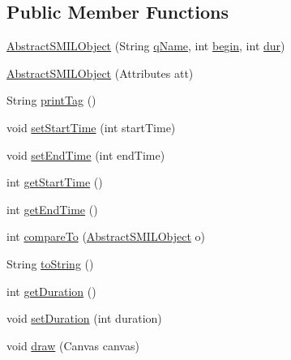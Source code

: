 \subsection*{Public Member Functions}
\begin{DoxyCompactItemize}
\item 
\hyperlink{classcsc440_1_1nuf_1_1components_1_1_abstract_s_m_i_l_object_a7d4ffbcec68b7a75bfb1a69b9ead2734}{Abstract\-S\-M\-I\-L\-Object} (String \hyperlink{classcsc440_1_1nuf_1_1components_1_1_abstract_s_m_i_l_object_a6f53b3bd6f031aea98d92c84ddd8c8db}{q\-Name}, int \hyperlink{classcsc440_1_1nuf_1_1components_1_1_abstract_s_m_i_l_object_a3279cee1dba4afdcc793a276d05bb7a1}{begin}, int \hyperlink{classcsc440_1_1nuf_1_1components_1_1_abstract_s_m_i_l_object_a8e4a82668aeae5fb178466d5579cd1e9}{dur})
\item 
\hyperlink{classcsc440_1_1nuf_1_1components_1_1_abstract_s_m_i_l_object_a30ec13c486b3b2ddd7c1911d69ebd8d3}{Abstract\-S\-M\-I\-L\-Object} (Attributes att)
\item 
String \hyperlink{classcsc440_1_1nuf_1_1components_1_1_abstract_s_m_i_l_object_a6b7e0dec2a36758ce801132d7c040974}{print\-Tag} ()
\item 
void \hyperlink{classcsc440_1_1nuf_1_1components_1_1_abstract_s_m_i_l_object_a63fa1f8e7b3d8e110fba9b9914137350}{set\-Start\-Time} (int start\-Time)
\item 
void \hyperlink{classcsc440_1_1nuf_1_1components_1_1_abstract_s_m_i_l_object_a3b153d8b1c68f8278a9565cc254e1a9e}{set\-End\-Time} (int end\-Time)
\item 
int \hyperlink{classcsc440_1_1nuf_1_1components_1_1_abstract_s_m_i_l_object_a243ba9744414f121ea34960bc4a15c26}{get\-Start\-Time} ()
\item 
int \hyperlink{classcsc440_1_1nuf_1_1components_1_1_abstract_s_m_i_l_object_acb56c0543fc58acf2929479598647bcb}{get\-End\-Time} ()
\item 
int \hyperlink{classcsc440_1_1nuf_1_1components_1_1_abstract_s_m_i_l_object_a85eb33753bf3769bc240cee7b632e8fd}{compare\-To} (\hyperlink{classcsc440_1_1nuf_1_1components_1_1_abstract_s_m_i_l_object}{Abstract\-S\-M\-I\-L\-Object} o)
\item 
String \hyperlink{classcsc440_1_1nuf_1_1components_1_1_abstract_s_m_i_l_object_ae615c694ad1f4377089ef15e41c77006}{to\-String} ()
\item 
int \hyperlink{classcsc440_1_1nuf_1_1components_1_1_abstract_s_m_i_l_object_abd5dd2e6eef92f800197b160936d9f35}{get\-Duration} ()
\item 
void \hyperlink{classcsc440_1_1nuf_1_1components_1_1_abstract_s_m_i_l_object_ab56e7a3d66c7dba0e005482e200792a2}{set\-Duration} (int duration)
\item 
void \hyperlink{classcsc440_1_1nuf_1_1components_1_1_abstract_s_m_i_l_object_a3bacb759032970e83ba2ffc4ed5179b9}{draw} (Canvas canvas)
\end{DoxyCompactItemize}
